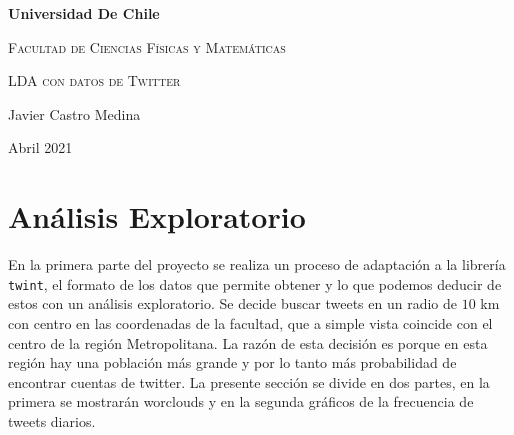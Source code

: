 \documentclass{article}
\begin{document}


\begin{titlepage}
	\centering
	{\bfseries\LARGE Universidad De Chile \par}
	\vspace{1cm}
	{\scshape\Large Facultad de Ciencias Físicas y Matemáticas \par}
	\vspace{3cm}
	{\scshape\Huge LDA con datos de Twitter \par}
	\vfill
	{\Large  Javier Castro Medina\par}

	\vfill
	{\Large Abril 2021 \par}
\end{titlepage}
\newpage

\section{Análisis Exploratorio}
En la primera parte del proyecto se realiza un proceso de adaptación a la librería \texttt{twint}, el formato de los datos que permite obtener y lo que podemos deducir de estos con un análisis exploratorio. Se decide buscar tweets en un radio de $10$ km con centro en las coordenadas de la facultad, que a simple vista coincide con el centro de la región Metropolitana. La razón de esta decisión es porque en esta región hay una población más grande y por lo tanto más probabilidad de encontrar cuentas de twitter. La presente sección se divide en dos partes, en la primera se mostrarán worclouds y en la segunda gráficos de la frecuencia de tweets diarios.
\end{document}
